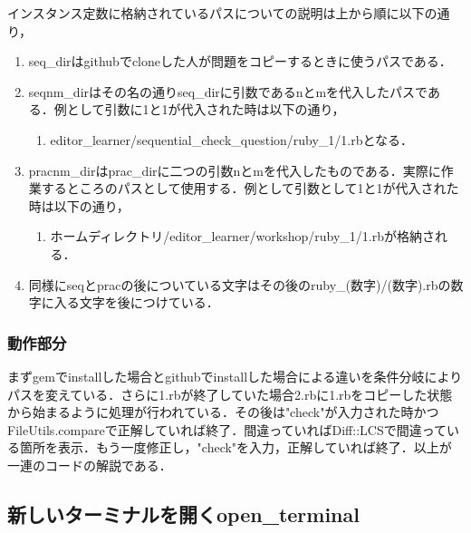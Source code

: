 \documentclass[11pt,dvipdfmx]{jsarticle}
\providecommand{\tightlist}{%
      \setlength{\itemsep}{0pt}\setlength{\parskip}{0pt}}
\begin{document}
インスタンス定数に格納されているパスについての説明は上から順に以下の通り，

\begin{enumerate}
\def\labelenumi{\arabic{enumi}.}
\tightlist
\item
  seq\_dirはgithubでcloneした人が問題をコピーするときに使うパスである．
\item
  seqnm\_dirはその名の通りseq\_dirに引数であるnとmを代入したパスである．例として引数に1と1が代入された時は以下の通り，

  \begin{enumerate}
  \def\labelenumii{\arabic{enumii}.}
  \tightlist
  \item
    editor\_learner/sequential\_check\_question/ruby\_1/1.rbとなる．
  \end{enumerate}
\item
  pracnm\_dirはprac\_dirに二つの引数nとmを代入したものである．実際に作業するところのパスとして使用する．例として引数として1と1が代入された時は以下の通り，

  \begin{enumerate}
  \def\labelenumii{\arabic{enumii}.}
  \tightlist
  \item
    ホームディレクトリ/editor\_learner/workshop/ruby\_1/1.rbが格納される．
  \end{enumerate}
\item
  同様にseqとpracの後についている文字はその後のruby\_(数字)/(数字).rbの数字に入る文字を後につけている．
\end{enumerate}

\subsubsection{動作部分}\label{ux52d5ux4f5cux90e8ux5206}

まずgemでinstallした場合とgithubでinstallした場合による違いを条件分岐によりパスを変えている．さらに1.rbが終了していた場合2.rbに1.rbをコピーした状態から始まるように処理が行われている．その後は"check"が入力された時かつFileUtils.compareで正解していれば終了．間違っていればDiff::LCSで間違っている箇所を表示．もう一度修正し，"check"を入力，正解していれば終了．以上が一連のコードの解説である．

    \subsection{新しいターミナルを開くopen\_terminal}\label{ux65b0ux3057ux3044ux30bfux30fcux30dfux30caux30ebux3092ux958bux304fopen_terminal}
\end{document}
